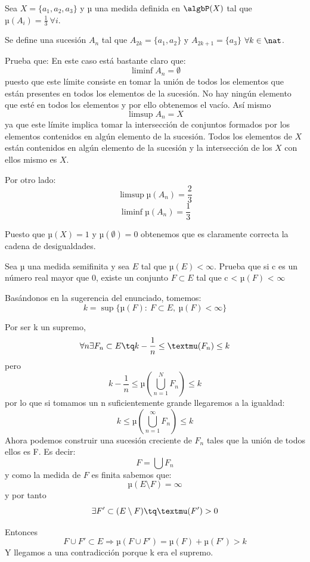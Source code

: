 \begin{problem}[7]
Sea $X=\{a_1, a_2, a_3\}$ y µ una medida definida en $\algbP (X)$ tal que $µ(A_i)=\frac{1}{3} \ \forall i$.

Se define una sucesión $A_n$ tal que $A_{2k}=\{a_1, a_2\}$ y $A_{2k+1}=\{a_3\}$ $\forall k \in \nat$.

Prueba que:
\solution
En este caso está bastante claro que:
\[\liminf A_n = \emptyset\]
puesto que este límite consiste en tomar la unión de todos los elementos que están presentes en todos los elementos de la sucesión. No hay ningún elemento que esté en todos los elementos y por ello obtenemos el vacío.
Así mismo
\[\limsup A_n = X\]
ya que este límite implica tomar la intersección de conjuntos formados por los elementos contenidos en algún elemento de la sucesión. Todos los elementos de $X$ están contenidos en algún elemento de la sucesión y la intersección de los $X$ con ellos mismo es $X$.

Por otro lado:
\[\limsup µ(A_n) = \frac{2}{3}\]
\[\liminf µ(A_n) = \frac{1}{3}\]

Puesto que $µ(X) =1$ y $µ(\emptyset)=0$ obtenemos que es claramente correcta la cadena de desigualdades.
\end{problem}


\begin{problem}[9]
Sea µ una medida semifinita y sea $E$ tal que $µ(E) < \infty$. Prueba que si c es un número real mayor que 0, existe un conjunto $F \subset E$ tal que c < $µ(F)$ < $\infty$

\solution
Basándonos en la sugerencia del enunciado, tomemos:
\[k=\sup \{µ(F): \ F \subset E, \ µ(F)< \infty \}\]

Por ser k un supremo,
\[\forall n \exists F_n \subset E \tq k-\frac{1}{n} \leq µ(F_n) \leq k\]
pero
\[k - \frac{1}{n} \leq µ(\bigcup_{n=1}^{N} F_n) \leq k\]
por lo que si tomamos un n suficientemente grande llegaremos a la igualdad:
\[k \leq µ(\bigcup_{n=1}^{\infty}F_n) \leq k\]
Ahora podemos construir una sucesión creciente de $F_n$ tales que la unión de todos ellos es F. Es decir:
\[F= \bigcup F_n\]
y como la medida de $F$ es finita sabemos que:
\[µ(E \setminus F)= \infty\]
y por tanto
\[\exists F'\subset (E \setminus F) \tq µ(F')> 0\]

Entonces
\[F \cup F' \subset E \Rightarrow µ(F \cup F')=µ(F)+µ(F') > k\]
Y llegamos a una contradicción porque k era el supremo.


\end{problem}

